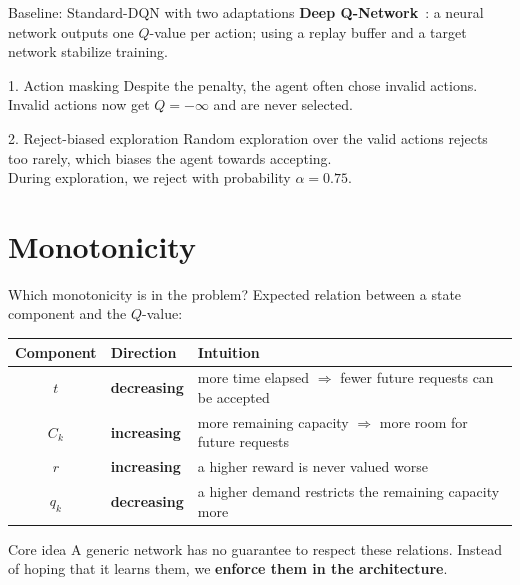 \documentclass[aspectratio=169, 11pt]{beamer}
\begin{document}
\begin{frame}{Baseline: Standard-DQN with two adaptations}
  \textbf{Deep Q-Network}~\cite{mnih2015}: a neural network outputs one $Q$-value per action;
  using a replay buffer and a target network stabilize training.

  \begin{block}{1. Action masking}
    Despite the penalty, the agent often chose invalid actions.\\
    Invalid actions now get $Q=-\infty$ and are never selected.
  \end{block}

  \begin{block}{2. Reject-biased exploration}
    Random exploration over the valid actions rejects too rarely, which biases the agent towards accepting.\\
    During exploration, we reject with probability $\alpha = 0.75$.
  \end{block}
\end{frame}

\section{Monotonicity}

\begin{frame}{Which monotonicity is in the problem?}
  Expected relation between a state component and the $Q$-value:

  \medskip
  \begin{center}
  \begin{tabular}{c l l}
    \toprule
    Component & Direction & Intuition \\
    \midrule
    $t$    & \textbf{decreasing} & more time elapsed $\Rightarrow$ fewer future requests can be accepted \\
    $C_k$  & \textbf{increasing} & more remaining capacity $\Rightarrow$ more room for future requests \\
    $r$    & \textbf{increasing} & a higher reward is never valued worse \\
    $q_k$  & \textbf{decreasing} & a higher demand restricts the remaining capacity more \\
    \bottomrule
  \end{tabular}
  \end{center}

  \medskip
  \begin{alertblock}{Core idea}
    A generic network has no guarantee to respect these relations.
    Instead of hoping that it learns them, we \textbf{enforce them in the architecture}.
  \end{alertblock}
\end{frame}
\end{document}
